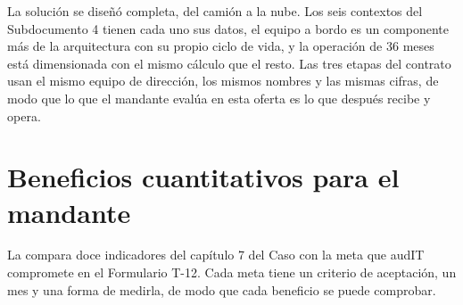 La solución se diseñó completa, del camión a la nube. Los seis contextos del Subdocumento 4 tienen cada
uno sus datos, el equipo a bordo es un componente más de la arquitectura con su propio ciclo de vida, y
la operación de 36 meses está dimensionada con el mismo cálculo que el resto. Las tres etapas del
contrato usan el mismo equipo de dirección, los mismos nombres y las mismas cifras, de modo que lo que el
mandante evalúa en esta oferta es lo que después recibe y opera.

\section{Beneficios cuantitativos para el mandante}\label{sec:14-beneficios-cuantitativos-para-el}

La  compara doce indicadores del capítulo 7 del Caso con la meta que audIT
compromete en el Formulario T-12. Cada meta tiene un criterio de aceptación, un mes y una forma de
medirla, de modo que cada beneficio se puede comprobar.

